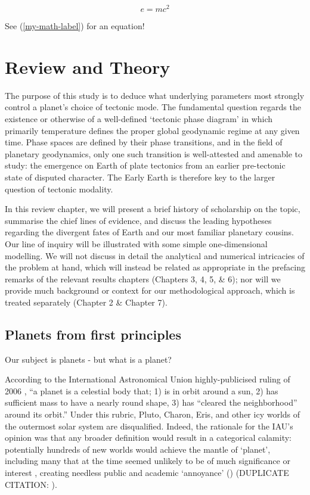 \documentclass[a4paper,11pt,oneside]{book}
\begin{document}
\begin{equation}
\label{my-math-label}
e=mc^2
\end{equation}

See (\ref{my-math-label}) for an equation!

\section{Review and Theory}

The purpose of this study is to deduce what underlying parameters most strongly control a planet's choice of tectonic mode. The fundamental question regards the existence or otherwise of a well-defined `tectonic phase diagram' in which primarily temperature defines the proper global geodynamic regime at any given time. Phase spaces are defined by their phase transitions, and in the field of planetary geodynamics, only one such transition is well-attested and amenable to study: the emergence on Earth of plate tectonics from an earlier pre-tectonic state of disputed character. The Early Earth is therefore key to the larger question of tectonic modality.

In this review chapter, we will present a brief history of scholarship on the topic, summarise the chief lines of evidence, and discuss the leading hypotheses regarding the divergent fates of Earth and our most familiar planetary cousins. Our line of inquiry will be illustrated with some simple one-dimensional modelling. We will not discuss in detail the analytical and numerical intricacies of the problem at hand, which will instead be related as appropriate in the prefacing remarks of the relevant results chapters (Chapters 3, 4, 5, \& 6); nor will we provide much background or context for our methodological approach, which is treated separately (Chapter 2 \& Chapter 7).

\subsection{Planets from first principles}

Our subject is planets - but what is a planet?

According to the International Astronomical Union highly-publicised ruling of 2006 \cite{International_Astronomical_Union2006-ft}, ``a planet is a celestial body that; 1) is in orbit around a sun, 2) has sufficient mass to have a nearly round shape, 3) has ``cleared the neighborhood'' around its orbit.'' Under this rubric, Pluto, Charon, Eris, and other icy worlds of the outermost solar system are disqualified. Indeed, the rationale for the IAU's opinion was that any broader definition would result in a categorical calamity: potentially hundreds of new worlds would achieve the mantle of `planet', including many that at the time seemed unlikely to be of much significance or interest \cite{Sarma2008-wu}, creating needless public and academic `annoyance' (\cite{Basri_2006}) (DUPLICATE CITATION: \cite{Basri2006-vw}).
\end{document}
